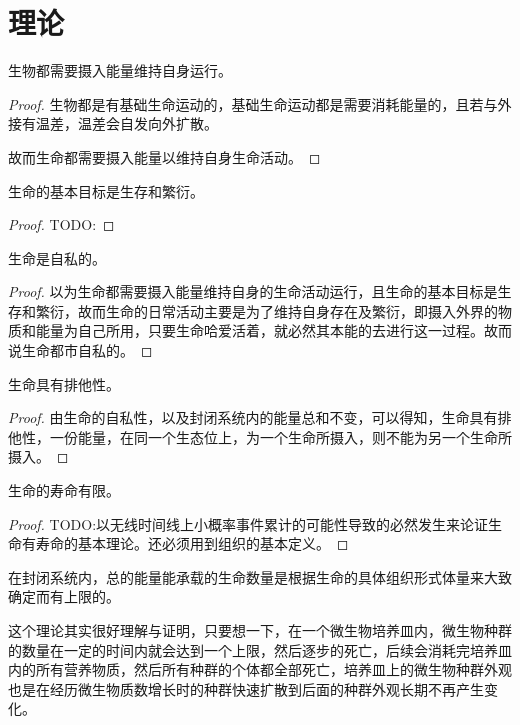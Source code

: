 \section{理论}
\theorem 生物都需要摄入能量维持自身运行。
\begin{proof}
    生物都是有基础生命运动的，基础生命运动都是需要消耗能量的，且若与外接有温差，温差会自发向外扩散。

    故而生命都需要摄入能量以维持自身生命活动。
\end{proof}

\begin{theorem}
    生命的基本目标是生存和繁衍。
\end{theorem}
\begin{proof}
    TODO:
\end{proof}

\begin{theorem}
    生命是自私的。
\end{theorem}
\begin{proof}
    以为生命都需要摄入能量维持自身的生命活动运行，且生命的基本目标是生存和繁衍，故而生命的日常活动主要是为了维持自身存在及繁衍，即摄入外界的物质和能量为自己所用，只要生命哈爱活着，就必然其本能的去进行这一过程。故而说生命都市自私的。
\end{proof}

\begin{theorem}
    生命具有排他性。
\end{theorem}
\begin{proof}
    由生命的自私性，以及封闭系统内的能量总和不变，可以得知，生命具有排他性，一份能量，在同一个生态位上，为一个生命所摄入，则不能为另一个生命所摄入。
\end{proof}

\begin{theorem}
    生命的寿命有限。
\end{theorem}
\begin{proof}
    TODO:以无线时间线上小概率事件累计的可能性导致的必然发生来论证生命有寿命的基本理论。还必须用到组织的基本定义。
\end{proof}

\begin{theorem}
    在封闭系统内，总的能量能承载的生命数量是根据生命的具体组织形式体量来大致确定而有上限的。
\end{theorem}

这个理论其实很好理解与证明，只要想一下，在一个微生物培养皿内，微生物种群的数量在一定的时间内就会达到一个上限，然后逐步的死亡，后续会消耗完培养皿内的所有营养物质，然后所有种群的个体都全部死亡，培养皿上的微生物种群外观也是在经历微生物质数增长时的种群快速扩散到后面的种群外观长期不再产生变化。


